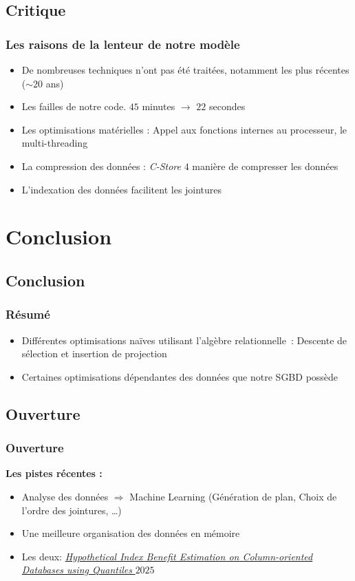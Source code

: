 \documentclass[aspectratio=43,12pt]{beamer}
\begin{document}
\subsection{Critique}
\begin{frame}
    \frametitle{Les raisons de la lenteur de notre modèle}
    \begin{itemize}
        \item De nombreuses techniques n'ont pas été traitées, notamment les plus récentes (\(\sim 20\) ans)
        \item Les failles de notre code. \(45\) minutes \(\to\) \(22\) secondes
        \item Les optimisations matérielles : Appel aux fonctions internes au processeur, le multi-threading
        \item La compression des données : \textit{C-Store} \(4\) manière de compresser les données
        \item L'indexation des données facilitent les jointures
    \end{itemize}
\end{frame}
\section{Conclusion}
\subsection{Conclusion}
\begin{frame}
    \frametitle{Résumé}
    \begin{itemize}
        \item Différentes optimisations naïves utilisant l'algèbre relationnelle : Descente de sélection et insertion de projection
        \item Certaines optimisations dépendantes des données que notre SGBD possède
    \end{itemize}
\end{frame}
\subsection{Ouverture}
\begin{frame}
    \frametitle{Ouverture}
    \textbf{Les pistes récentes :}
    \begin{itemize}
        \item Analyse des données \(\Rightarrow\) Machine Learning (Génération de plan, Choix de l'ordre des jointures, \dots)
        \item Une meilleure organisation des données en mémoire 
        \item Les deux: \href{https://www.normalesup.org/~rouvroy/papers/NTU_25_QHICS.pdf}{\textit{Hypothetical Index Benefit Estimation on Column-oriented Databases using Quantiles} \(2025\)}

    \end{itemize}

\end{frame}
\end{document}

